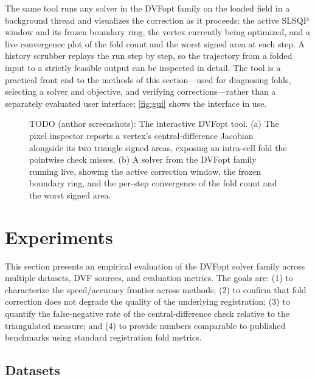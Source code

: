 \documentclass[lettersize,journal]{IEEEtran}
\begin{document}
The same tool runs any solver in the DVFopt family on the loaded field in a background thread and visualizes the correction as it proceeds: the active SLSQP window and its frozen boundary ring, the vertex currently being optimized, and a live convergence plot of the fold count and the worst signed area at each step. A history scrubber replays the run step by step, so the trajectory from a folded input to a strictly feasible output can be inspected in detail. The tool is a practical front end to the methods of this section---used for diagnosing folds, selecting a solver and objective, and verifying corrections---rather than a separately evaluated user interface; \autoref{fig:gui} shows the interface in use.

\begin{figure}[ht]
\centering
\caption{TODO (author screenshots): The interactive DVFopt tool. (a) The pixel inspector reports a vertex's central-difference Jacobian alongside its two triangle signed areas, exposing an intra-cell fold the pointwise check misses. (b) A solver from the DVFopt family running live, showing the active correction window, the frozen boundary ring, and the per-step convergence of the fold count and the worst signed area.}
\label{fig:gui}
\end{figure}

\section{Experiments}
\label{sec:experiments}

This section presents an empirical evaluation of the DVFopt solver family across multiple datasets, DVF sources, and evaluation metrics. The goals are: (1) to characterize the speed/accuracy frontier across methods; (2) to confirm that fold correction does not degrade the quality of the underlying registration; (3) to quantify the false-negative rate of the central-difference check relative to the triangulated measure; and (4) to provide numbers comparable to published benchmarks using standard registration fold metrics.

\subsection{Datasets}
\label{sec:datasets}
\end{document}
